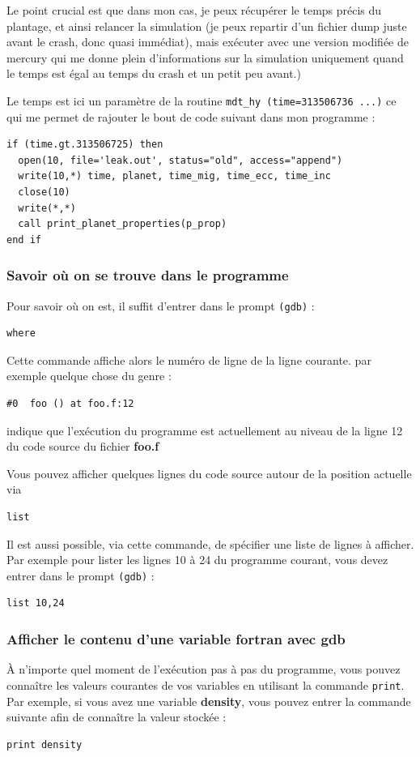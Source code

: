 \documentclass[a4paper,twoside]{article}
\begin{document}
\begin{important}
Le point crucial est que dans mon cas, je peux récupérer le temps précis du plantage, et ainsi relancer la simulation (je peux repartir d'un fichier dump juste avant le crash, donc quasi immédiat), mais exécuter avec une version modifiée de mercury qui me donne plein d'informations sur la simulation uniquement quand le temps est égal au temps du crash et un petit peu avant.)

Le temps est ici un paramètre de la routine \verb|mdt_hy (time=313506736 ...)| ce qui me permet de rajouter le bout de code suivant dans mon programme : 
\begin{verbatim}
if (time.gt.313506725) then
  open(10, file='leak.out', status="old", access="append")
  write(10,*) time, planet, time_mig, time_ecc, time_inc
  close(10)
  write(*,*)
  call print_planet_properties(p_prop)
end if
\end{verbatim}
\end{important}

\subsubsection{Savoir où on se trouve dans le programme}
Pour savoir où on est, il suffit d'entrer dans le prompt \texttt{(gdb)} :
\begin{verbatim}
where
\end{verbatim}
Cette commande affiche alors le numéro de ligne de la ligne courante. par exemple quelque chose du genre : 
\begin{verbatim}
#0  foo () at foo.f:12
\end{verbatim}
indique que l'exécution du programme est actuellement au niveau de la ligne 12 du code source du fichier \textbf{foo.f}

\bigskip

Vous pouvez afficher quelques lignes du code source autour de la position actuelle via 
\begin{verbatim}
list
\end{verbatim}

Il est aussi possible, via cette commande, de spécifier une liste de lignes à afficher. Par exemple pour lister les lignes 10 à 24 du programme courant, vous devez entrer dans le prompt \texttt{(gdb)} :
\begin{verbatim}
list 10,24
\end{verbatim}

\subsubsection{Afficher le contenu d'une variable fortran avec gdb}
À n'importe quel moment de l'exécution pas à pas du programme, vous pouvez connaître les valeurs courantes de vos variables en utilisant la commande \texttt{print}. Par exemple, si vous avez une variable \textbf{density}, vous pouvez entrer la commande suivante afin de connaître la valeur stockée : 
\begin{verbatim}
print density
\end{verbatim}
 
\end{document}
